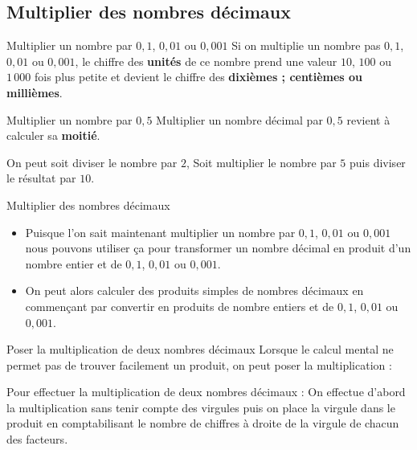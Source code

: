\begin{pageCours} %


\section{Multiplier des nombres décimaux}

\begin{MtT}{{Multiplier un nombre par $0,1$, $0,01$ ou $0,001$}}
Si on multiplie un nombre pas $0,1$, $0,01$ ou $0,001$, le chiffre des \textbf{unités} de ce nombre prend une valeur $10$, $100$ ou $1\, 000$ fois plus petite et devient le chiffre des \textbf{dixièmes ; centièmes ou millièmes}.
\end{MtT} 

\begin{MtT}{{Multiplier un nombre par $0,5$}}
Multiplier un nombre décimal par $0,5$ revient à calculer sa \textbf{moitié}.

On peut soit diviser le nombre par $2$, Soit multiplier le nombre par $5$ puis diviser le résultat par $10$.
\end{MtT}

\begin{MtT}{Multiplier des nombres décimaux}
\begin{itemize}
\item Puisque l'on sait maintenant multiplier un nombre par $0,1$, $0,01$ ou $0,001$ nous pouvons utiliser ça pour transformer un nombre décimal en produit d'un nombre entier et de $0,1$, $0,01$ ou $0,001$.
\item On peut alors calculer des produits simples de nombres décimaux en commençant par convertir en produits de nombre entiers et de $0,1$, $0,01$ ou $0,001$.
\end{itemize}
\end{MtT}

\begin{MtT}{Poser la multiplication de deux nombres décimaux}
Lorsque le calcul mental ne permet pas de trouver facilement un produit, on peut poser la multiplication :

Pour effectuer la multiplication de deux nombres décimaux : On effectue d'abord la multiplication sans tenir compte des virgules puis on place la virgule dans le produit en comptabilisant le nombre de chiffres à droite de la virgule de chacun des facteurs.
\end{MtT}


\end{pageCours}

